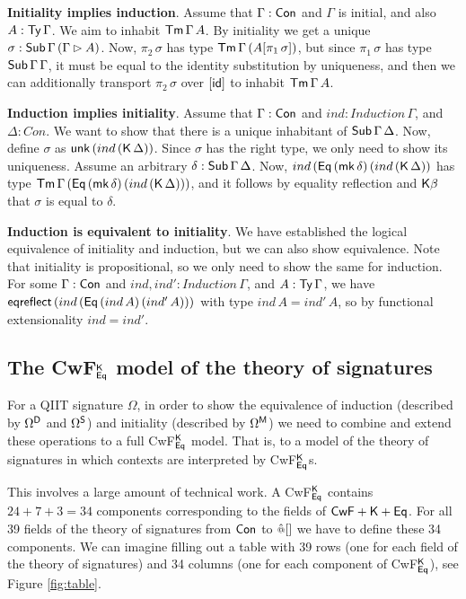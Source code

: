 \documentclass[acmsmall,review]{acmart}\settopmatter{printfolios=true,printccs=false,printacmref=false}
\begin{document}
\textbf{Initiality implies induction}. Assume that $\Gamma : \Con$ and
$\Gamma$ is initial, and also $A : \Ty\,\Gamma$. We aim to inhabit
$\Tm\,\Gamma\,A$. By initiality we get a unique $\sigma :
\Sub\,\Gamma\,(\Gamma \rhd A)$. Now, $\pi_2\,\sigma$ has type
$\Tm\,\Gamma\,(A[\pi_1\,\sigma])$, but since $\pi_1\,\sigma$ has type
$\Tms\,\Gamma\,\Gamma$, it must be equal to the identity substitution
by uniqueness, and then we can additionally transport
$\pi_2\,\sigma$ over $[\id]$ to inhabit $\Tm\,\Gamma\,A$.

\textbf{Induction implies initiality}. Assume that $\Gamma : \Con$ and
$ind : Induction\,\Gamma$, and $\Delta : Con$. We want to show that
there is a unique inhabitant of $\Tms\,\Gamma\,\Delta$. Now, define
$\sigma$ as $\unk\,(ind\,(\K\,\Delta))$. Since $\sigma$ has the right
type, we only need to show its uniqueness. Assume an arbitrary $\delta
: \Tms\,\Gamma\,\Delta$. Now,
$ind\,(\Eq\,(\mk\,\delta)\,(ind\,(\K\,\Delta))$ has type
$\Tm\,\Gamma\,(\Eq\,(\mk\,\delta)\,(ind\,(\K\,\Delta)))$, and it
follows by equality reflection and $\K\beta$ that $\sigma$ is equal to
$\delta$.

\textbf{Induction is equivalent to initiality}. We have established
the logical equivalence of initiality and induction, but we can also
show equivalence. Note that initiality is propositional, so we only
need to show the same for induction. For some $\Gamma : \Con$ and
$ind, ind' : Induction\,\Gamma$, and $A : \Ty\,\Gamma$, we have
$\eqreflect\,(ind\,(\Eq\,(ind\,A)\,(ind'\,A)))$ with type $ind\,A =
ind'\,A$, so by functional extensionality $ind = ind'$.

\subsection{The CwF$^\K_{\Eq}$ model of the theory of signatures}
\label{sec:cwfmodel}

For a QIIT signature $\Omega$, in order to show the equivalence of
induction (described by $\Omega^\D$ and $\Omega^\S$) and initiality
(described by $\Omega^\M$) we need to combine and extend these
operations to a full CwF$^\K_{\Eq}$ model. That is, to a model of the
theory of signatures in which contexts are interpreted by
CwF$^\K_{\Eq}$s.

This involves a large amount of technical work. A CwF$^\K_{\Eq}$
contains $24+7+3=34$ components corresponding to the fields of
$\mathsf{CwF}+\K+\Eq$. For all 39 fields of the theory of signatures
from $\Con$ to ${\appm[]}$ we have to define these 34 components. We
can imagine filling out a table with 39 rows (one for each field of
the theory of signatures) and 34 columns (one for each component of
CwF$^\K_{\Eq}$), see Figure \ref{fig:table}.
\end{document}
